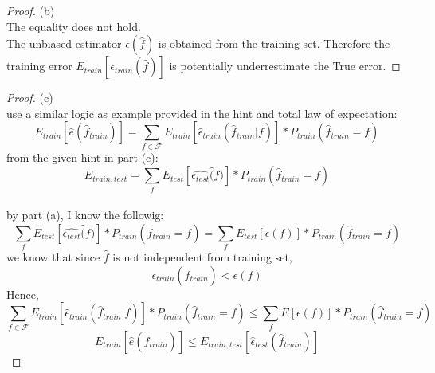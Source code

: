 \documentclass[12pt]{article}
\begin{document}
\begin{proof}
        (b)\\
        The equality does not hold. \\
        The unbiased estimator $\epsilon(\widehat{f})$ is obtained from the training set. Therefore the training error $E_{train}[\epsilon_{train}(\widehat{f})]$ is potentially underrestimate the True error.  
\end{proof}

\begin{proof}
        (c)\\
use a similar logic as example provided in the hint and total law of expectation: 
$$E_{train} [\widehat{e}(\widehat{f}_{train})] =\sum_{f \in \mathcal{F}}E_{train}[\widehat{\epsilon}_{train}(\widehat{f}_{train} |f)] *P_{train}(\widehat{f}_{train} = f)  $$
from the given hint in part (c): $$E_{train,test} =\sum_{f}E_{test}[\widehat{\epsilon_{test}}\widehat(f)] *P_{train}(\widehat{f}_{train} = f)  $$\\
by part (a), I know the followig:
 $$\sum_{f}E_{test}[\widehat{\epsilon_{test}}\widehat(f)] *P_{train}(\widehat{f}_{train} = f) = \sum_{f}E_{test}[\epsilon(f)] *P_{train}(\widehat{f}_{train} = f)$$ 
 we know that since $\widehat{f}$ is not independent from training set, $$\epsilon_{train}(\widehat{f}_{train}) < \epsilon(f)$$ 
Hence,
$$\sum_{f \in \mathcal{F}}E_{train}[\widehat{\epsilon}_{train}(\widehat{f}_{train} |f)] *P_{train}(\widehat{f}_{train} = f) \leq \sum_{f}E[{\epsilon}(f)] *P_{train}(\widehat{f}_{train} = f)  $$
$$ E_{train} [\widehat{e}(\widehat{f}_{train})] \leq  E_{train,test} [\widehat{\epsilon}_{test}(\widehat{f}_{train})]$$
\end{proof}

\newpage
\end{document}
